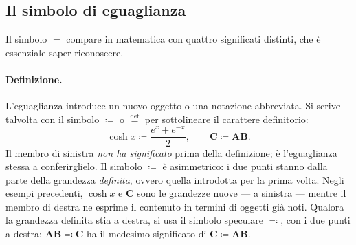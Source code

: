 \subsection{Il simbolo di eguaglianza}\label{sec:eguaglianza}

Il simbolo $=$ compare in matematica con quattro significati distinti, che \`e
essenziale saper riconoscere.

\paragraph{Definizione.}
L'eguaglianza introduce un nuovo oggetto o una notazione abbreviata. Si scrive talvolta con il simbolo $\coloneqq$
o $\stackrel{\mathrm{def}}{=}$ per sottolineare il carattere definitorio:
\begin{equation}
	\cosh x \coloneqq \frac{e^x + e^{-x}}{2}, \qquad
	\bm{C} \coloneqq \bm{A}\bm{B}.
\end{equation}
Il membro di sinistra \textit{non ha significato} prima della definizione; è l'eguaglianza stessa a conferirglielo. Il simbolo $\coloneqq$ è asimmetrico: i due punti stanno dalla parte della grandezza \emph{definita}, ovvero quella introdotta per la prima volta. Negli esempi precedenti, $\cosh x$ e $\bm{C}$ sono le grandezze nuove --- a sinistra --- mentre il membro di destra ne esprime il
contenuto in termini di oggetti già noti. Qualora la grandezza definita stia a destra, si usa il simbolo speculare $\eqqcolon$, con i due punti a destra: $\bm{A}\bm{B} \eqqcolon \bm{C}$ ha il medesimo significato di $\bm{C} \coloneqq \bm{A}\bm{B}$.

